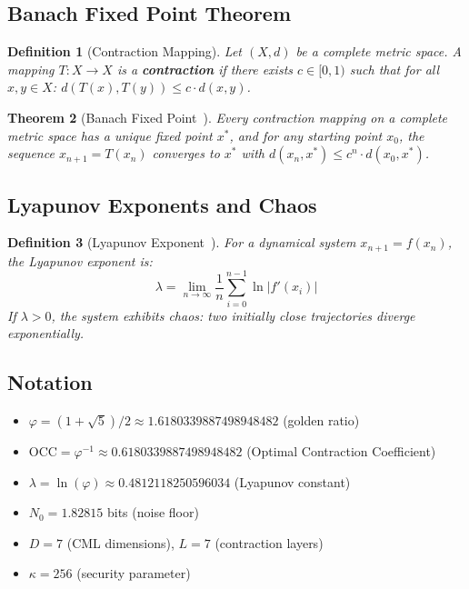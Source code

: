 \documentclass[11pt,a4paper]{article}
\newtheorem{theorem}{Theorem}[section]
\newtheorem{definition}[theorem]{Definition}
\begin{document}
\subsection{Banach Fixed Point Theorem}

\begin{definition}[Contraction Mapping]
Let $(X, d)$ be a complete metric space. A mapping $T : X \to X$ is a \textbf{contraction} if there exists $c \in [0, 1)$ such that for all $x, y \in X$: $d(T(x), T(y)) \leq c \cdot d(x, y)$.
\end{definition}

\begin{theorem}[Banach Fixed Point~\cite{banach22}]
Every contraction mapping on a complete metric space has a unique fixed point $x^*$, and for any starting point $x_0$, the sequence $x_{n+1} = T(x_n)$ converges to $x^*$ with $d(x_n, x^*) \leq c^n \cdot d(x_0, x^*)$.
\end{theorem}

\subsection{Lyapunov Exponents and Chaos}

\begin{definition}[Lyapunov Exponent~\cite{lyapunov1892}]
For a dynamical system $x_{n+1} = f(x_n)$, the Lyapunov exponent is:
\[
\lambda = \lim_{n \to \infty} \frac{1}{n} \sum_{i=0}^{n-1} \ln |f'(x_i)|
\]
If $\lambda > 0$, the system exhibits chaos: two initially close trajectories diverge exponentially.
\end{definition}

\subsection{Notation}
\begin{itemize}
\item $\varphi = (1 + \sqrt{5})/2 \approx 1.6180339887498948482$ (golden ratio)
\item $\text{OCC} = \varphi^{-1} \approx 0.6180339887498948482$ (Optimal Contraction Coefficient)
\item $\lambda = \ln(\varphi) \approx 0.4812118250596034$ (Lyapunov constant)
\item $N_0 = 1.82815$ bits (noise floor)
\item $D = 7$ (CML dimensions), $L = 7$ (contraction layers)
\item $\kappa = 256$ (security parameter)
\end{itemize}
\end{document}
